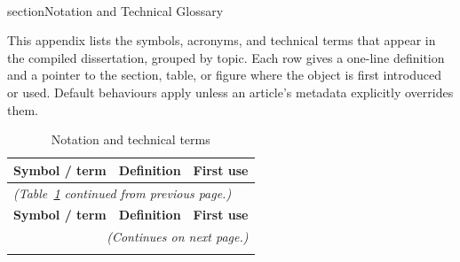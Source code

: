 \\section{Notation and Technical Glossary}
\label{AppendixE}

This appendix lists the symbols, acronyms, and technical terms that appear in
the compiled dissertation, grouped by topic. Each row gives a one-line
definition and a pointer to the section, table, or figure where the object is
first introduced or used. Default behaviours apply unless an article's metadata
explicitly overrides them.

\begin{small}
\begin{longtable}{@{}p{3.5cm} p{9.5cm} p{2.0cm}@{}}
\caption{Notation and technical terms}
\label{tab:notation} \\
\toprule
\textbf{Symbol / term} & \textbf{Definition} & \textbf{First use} \\
\midrule
\endfirsthead

\multicolumn{3}{l}{\footnotesize\textit{(Table~\ref{tab:notation} continued from previous page.)}} \\
\toprule
\textbf{Symbol / term} & \textbf{Definition} & \textbf{First use} \\
\midrule
\endhead

\midrule
\multicolumn{3}{r}{\footnotesize\textit{(Continues on next page.)}} \\
\endfoot

\bottomrule
\endlastfoot


\end{longtable}
\end{small}
